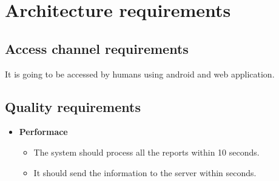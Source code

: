 \documentclass[10pt,a4paper]{article}
\begin{document}
\pagebreak
\section{Architecture requirements}
\subsection{Access channel requirements}
\indent It is going to be accessed by humans using android and web application.
                                                                                               
\subsection{Quality requirements}
\begin{itemize}
\item\textbf{Performace}
\begin{itemize}
	\item The system should process all the reports within 10 seconds.
	\item It should send the information to the server within seconds.
\end{itemize}
               

\end{itemize}
\end{document}
